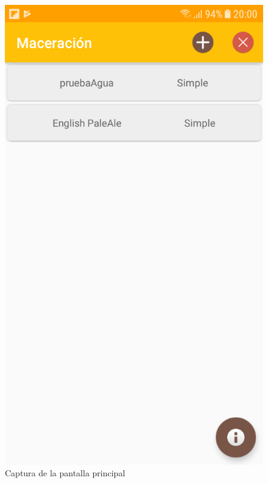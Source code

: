                 \begin{figure}[h]
                    \centering
                    \includegraphics[scale=0.2]{software/ScreenCapture/MainActivity.jpg}
                    \caption{Captura de la pantalla principal}
                    \label{fig:CapturaMainAct}
                \end{figure}
